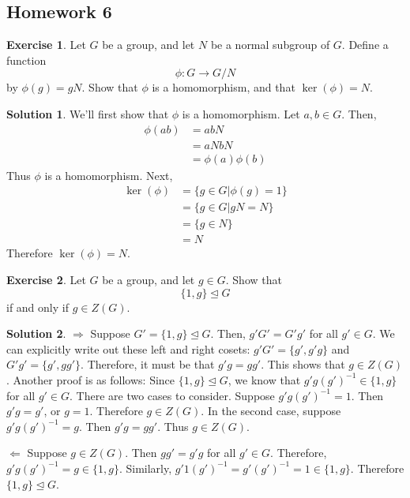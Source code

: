 \documentclass[12pt]{article}
\theoremstyle{definition}
\newtheorem{exercise}{\color{YellowOrange}Exercise}
\theoremstyle{definition}
\newtheorem{solution}{\color{Goldenrod}Solution}
\begin{document}
\subsection{Homework 6}
\begin{exercise}
	Let $G$ be a group, and let $N$ be a normal subgroup of $G$. Define a function 
	\begin{equation}
		\phi : G \to G / N
	\end{equation}
	by $\phi(g) = gN$. Show that $\phi$ is a homomorphism, and that $\ker(\phi) = N$.
\end{exercise}
\begin{solution}
	We'll first show that $\phi$ is a homomorphism. Let $a,b \in G$. Then,
	\begin{align*}
	\phi(ab) &= abN \\
	&= aNbN \tag{definition of multiplication on quotient groups} \\
	&= \phi(a)\phi(b) 
	\end{align*}
	Thus $\phi$ is a homomorphism. Next,
	\begin{align*}
	\ker(\phi) &= \{ g \in G | \phi(g) = 1 \} \\
	&= \{ g \in G | gN = N \} \\
	&= \{ g \in N \} \\
	&= N
	\end{align*}
	Therefore $\ker(\phi) = N$. 
\end{solution}

\begin{exercise}
	Let $G$ be a group, and let $g \in G$. Show that 
	\begin{equation}
		\{1, g\} \trianglelefteq G
	\end{equation}
	if and only if $g \in Z(G)$. 
\end{exercise}
\begin{solution}
	$\Rightarrow$ Suppose $G' = \{1, g\} \trianglelefteq G$. Then, $g'G' = G'g'$ for all $g' \in G$. We can explicitly write out these left and right cosets: $g'G' = \{g', g'g \}$ and $G'g' = \{g', gg'\}$. Therefore, it must be that $g'g = gg'$. This shows that $g \in Z(G)$. Another proof is as follows: Since $\{1, g\} \trianglelefteq G$, we know that $g'g(g')^{-1} \in \{1, g\}$ for all $g' \in G$. There are two cases to consider. Suppose $g' g (g')^{-1} = 1$. Then $g'g = g'$, or $g = 1$. Therefore $g \in Z(G)$. In the second case, suppose $g' g (g')^{-1} = g$. Then $g'g = gg'$. Thus $g \in Z(G)$. 

	$\Leftarrow$ Suppose $g \in Z(G)$. Then $gg' = g'g$ for all $g' \in G$. Therefore, $g'g(g')^{-1} = g \in \{1, g\}$. Similarly, $g'1(g')^{-1} = g'(g')^{-1} = 1 \in \{1, g\}$. Therefore $\{1, g\} \trianglelefteq G$.
\end{solution}
\end{document}
